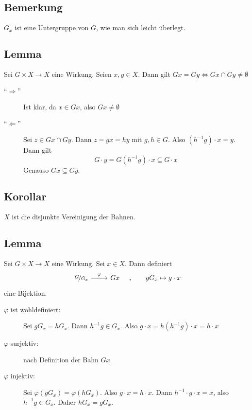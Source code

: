 \subsection[Bemerkung: $G_x$ ist eine Untergruppe von $G$]{Bemerkung} %
\label{sub:36}
$G_x$ ist eine Untergruppe von $G$, wie man sich leicht überlegt.

\subsection[Lemma über die Gleichheit von Bahnen]{Lemma} %
\label{sub:37}
Sei $G \times X \to X$ eine Wirkung. Seien $x,y \in X$. Dann gilt $Gx= Gy \Longleftrightarrow Gx \cap Gy \not= \emptyset$
\begin{description}
	\item[\enquote{$\Rightarrow$}] Ist klar, da $x \in Gx$, also $Gx \not= \emptyset$
	\item[\enquote{$\Leftarrow$}] Sei $z \in Gx \cap Gy$. Dann $z= gx= hy$ mit $g,h \in G$. Also $(h ^{-1} g) \cdot x = y$. Dann gilt
	\[
		G \cdot y = G (h ^{-1} g) \cdot x \subseteq G \cdot x
	\]
	Genauso $Gx \subseteq Gy$. \bewende
\end{description}

\subsection[Korollar: $X$ ist die disjunkte Vereinigung der Bahnen]{Korollar} %
\label{sub:38}
$X$ ist die disjunkte Vereinigung der Bahnen.

\subsection[Lemma: Bijektion $\nicefrac{G}{G_x} \to Gx$]{Lemma} %
\label{sub:39}
Sei $G \times X \to X$ eine Wirkung. Sei $x \in X$. Dann definiert 
\[
	\begin{tikzcd}
		\nicefrac{G}{G_x} \rar{\varphi} & Gx
	\end{tikzcd} \quad , \qquad  g G_x \mapsto g \cdot x
\]
eine Bijektion.
\begin{description}
	\item[$\varphi$ ist wohldefiniert:] Sei $gG_x = hG_x$. Dann $h ^{-1} g \in G_x$. Also $g \cdot x = h (h ^{-1} g) \cdot x = h \cdot x$
	\item[$\varphi$ surjektiv:] nach Definition der Bahn $Gx$.
	\item[$\varphi$ injektiv:] Sei $\varphi(gG_x) = \varphi(h G_x)$. Also $g \cdot x = h \cdot x$. Dann $h ^{-1} \cdot g \cdot x = x$, also $h ^{-1} g \in G_x$. Daher
	$hG_x= gG_x$. \bewende
\end{description}


